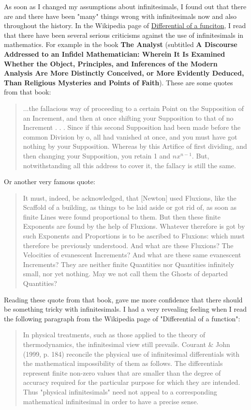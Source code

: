 \documentclass[11pt,a4paper]{article}
\begin{document}
As soon as I changed my assumptions about infinitesimals, I found out that there are and there have been "many" things wrong with infinitesimals now and also throughout the history. In the Wikipedia page of \href{https://en.wikipedia.org/wiki/Differential_of_a_function}{Differential of a funciton}, I read that there have been several serious criticisms against the use of infinitesimals in mathematics. For example in the book \textbf{The Analyst} (subtitled \textbf{A Discourse Addressed to an Infidel Mathematician: Wherein It Is Examined Whether the Object, Principles, and Inferences of the Modern Analysis Are More Distinctly Conceived, or More Evidently Deduced, Than Religious Mysteries and Points of Faith}). These are some quotes from that book:
\begin{quote}
	...the fallacious way of proceeding to a certain Point on the Supposition of an Increment, and then at once shifting your Supposition to that of no Increment . . . Since if this second Supposition had been made before the common Division by o, all had vanished at once, and you must have got nothing by your Supposition. Whereas by this Artifice of first dividing, and then changing your Supposition, you retain 1 and $nx^{n-1}$. But, notwithstanding all this address to cover it, the fallacy is still the same.
\end{quote}
Or another very famous quote:
\begin{quote}
	It must, indeed, be acknowledged, that [Newton] used Fluxions, like the Scaffold of a building, as things to be laid aside or got rid of, as soon as finite Lines were found proportional to them. But then these finite Exponents are found by the help of Fluxions. Whatever therefore is got by such Exponents and Proportions is to be ascribed to Fluxions: which must therefore be previously understood. And what are these Fluxions? The Velocities of evanescent Increments? And what are these same evanescent Increments? They are neither finite Quantities nor Quantities infinitely small, nor yet nothing. May we not call them the Ghosts of departed Quantities?
\end{quote}

Reading these quote from that book, gave me more confidence that there should be something tricky with infinitesimals. I had a very revealing feeling when I read the following paragraph from the Wikipedia page of "Differential of a function":

\begin{quote}
	In physical treatments, such as those applied to the theory of thermodynamics, the infinitesimal view still prevails. Courant \& John (1999, p. 184) reconcile the physical use of infinitesimal differentials with the mathematical impossibility of them as follows. The differentials represent finite non-zero values that are smaller than the degree of accuracy required for the particular purpose for which they are intended. Thus "physical infinitesimals" need not appeal to a corresponding mathematical infinitesimal in order to have a precise sense.
\end{quote}
\end{document}

